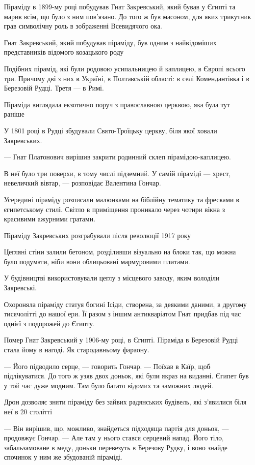 \documentclass[a4paper,11pt]{extreport}
\begin{document}
Піраміду в 1899-му році побудував Гнат Закревський, який бував у Єгипті та
марив всім, що було з ним пов'язано. До того ж був масоном, для яких трикутник
грав символічну роль в зображенні Всевидячого ока.

Гнат Закревський, який побудував піраміду, був одним з найвідоміших
представників відомого козацького роду

Подібних пірамід, які були родовою усипальницею й каплицею, в Європі всього
три. Причому дві з них в Україні, в Полтавській області: в селі Комендантівка і
в Березовій Рудці. Третя --- в Римі.

Піраміда виглядала екзотично поруч з православною церквою, яка була тут раніше

У 1801 році в Рудці збудували Свято-Троїцьку церкву, біля якої ховали
Закревських.

--- Гнат Платонович вирішив закрити родинний склеп пірамідою-каплицею. 

В неї було три поверхи, в тому числі підземний. У самій піраміді --- хрест,
невеличкий вівтар, --- розповідає Валентина Гончар.

Усередині піраміду розписали малюнками на біблійну тематику та фресками в
єгипетському стилі. Світло в приміщення проникало через чотири вікна з
красивими ажурними гратами.

Піраміду Закревських розграбували після революції 1917 року

Цегляні стіни залили бетоном, розділивши візуально на блоки так, що можна було
подумати, ніби вони облицьовані мармуровими плитами.

У будівництві використовували цеглу з місцевого заводу, яким володіли
Закревські.

Охороняла піраміду статуя богині Ісіди, створена, за деякими даними, в другому
тисячолітті до нашої ери. Її разом з іншим антикваріатом Гнат придбав під час
однієї з подорожей до Єгипту.

Помер Гнат Закревський у 1906-му році, в Єгипті. Піраміда в Березовій Рудці
стала йому в нагоді. Як стародавньому фараону.  

--- Його підводило серце, --- говорить Гончар. --- Поїхав в Каїр, щоб підлікуватися.
До того ж узяв двох доньок, які були якраз на виданні. Єгипет був у той час
дуже модним. Там було багато відомих та заможних людей. 

Дрон дозволяє зняти піраміду без зайвих радянських будівель, які з'явилися біля
неї в 20 столітті

---  Він вирішив, що, можливо, знайдеться підходяща партія для доньок, ---
продовжує Гончар. ---  Але там у нього стався серцевий напад. Його тіло,
забальзамоване в меду, доньки перевезуть в Березову Рудку, і воно знайде
спочинок у ним же збудованій піраміді.
\end{document}
